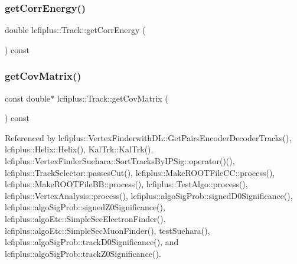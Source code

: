 \mbox{\label{classlcfiplus_1_1Track_a425282a40f09259e5c250d85a65caded}} 
\subsubsection{get\+Corr\+Energy()}
{\footnotesize\ttfamily double lcfiplus\+::\+Track\+::get\+Corr\+Energy (\begin{DoxyParamCaption}{ }\end{DoxyParamCaption}) const\hspace{0.3cm}{\ttfamily [inline]}}

\mbox{\label{classlcfiplus_1_1Track_a197faef4df9df281acb26b39d9c8e3f7}} 
\subsubsection{get\+Cov\+Matrix()}
{\footnotesize\ttfamily const double$\ast$ lcfiplus\+::\+Track\+::get\+Cov\+Matrix (\begin{DoxyParamCaption}{ }\end{DoxyParamCaption}) const\hspace{0.3cm}{\ttfamily [inline]}}



Referenced by lcfiplus\+::\+Vertex\+Finderwith\+D\+L\+::\+Get\+Pairs\+Encoder\+Decoder\+Tracks(), lcfiplus\+::\+Helix\+::\+Helix(), Kal\+Trk\+::\+Kal\+Trk(), lcfiplus\+::\+Vertex\+Finder\+Suehara\+::\+Sort\+Tracks\+By\+I\+P\+Sig\+::operator()(), lcfiplus\+::\+Track\+Selector\+::passes\+Cut(), lcfiplus\+::\+Make\+R\+O\+O\+T\+File\+C\+C\+::process(), lcfiplus\+::\+Make\+R\+O\+O\+T\+File\+B\+B\+::process(), lcfiplus\+::\+Test\+Algo\+::process(), lcfiplus\+::\+Vertex\+Analysis\+::process(), lcfiplus\+::algo\+Sig\+Prob\+::signed\+D0\+Significance(), lcfiplus\+::algo\+Sig\+Prob\+::signed\+Z0\+Significance(), lcfiplus\+::algo\+Etc\+::\+Simple\+Sec\+Electron\+Finder(), lcfiplus\+::algo\+Etc\+::\+Simple\+Sec\+Muon\+Finder(), test\+Suehara(), lcfiplus\+::algo\+Sig\+Prob\+::track\+D0\+Significance(), and lcfiplus\+::algo\+Sig\+Prob\+::track\+Z0\+Significance().

\mbox{\label{classlcfiplus_1_1Track_a9d8ba178ad0aa1f7527dbaa964c69e02}} 
